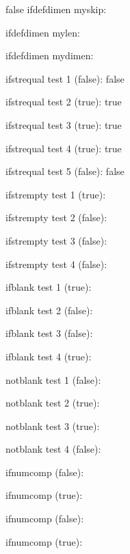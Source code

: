 \documentclass{article}
\begin{document}
\begin{true}{false}
ifdefdimen myskip: 

ifdefdimen mylen: 

ifdefdimen mydimen: 


ifstrequal test 1 (false): \ifstrequal{my\relaxing}{\myrelaxing}{true}{false}

ifstrequal test 2 (true): \ifstrequal{my\relaxing}{my\relaxing}{true}{false}

ifstrequal test 3 (true): \ifstrequal{\myrelaxing}{\myrelaxing}{true}{false}

ifstrequal test 4 (true): \ifstrequal{simple}{simple}{true}{false}

ifstrequal test 5 (false): \ifstrequal{simple}{simpler}{true}{false}

ifstrempty test 1 (true): 

ifstrempty test 2 (false): 

ifstrempty test 3 (false): 

ifstrempty test 4 (false): 

ifblank test 1 (true): 

ifblank test 2 (false): 

ifblank test 3 (false): 

ifblank test 4 (true): 

notblank test 1 (false): 

notblank test 2 (true): 

notblank test 3 (true): 

notblank test 4 (false): 


ifnumcomp (false): 

ifnumcomp (true): 

ifnumcomp (false): 

\setcounter{countA}{6}
\setcounter{countB}{5}

ifnumcomp (true): 


\end{true}
\end{document}
